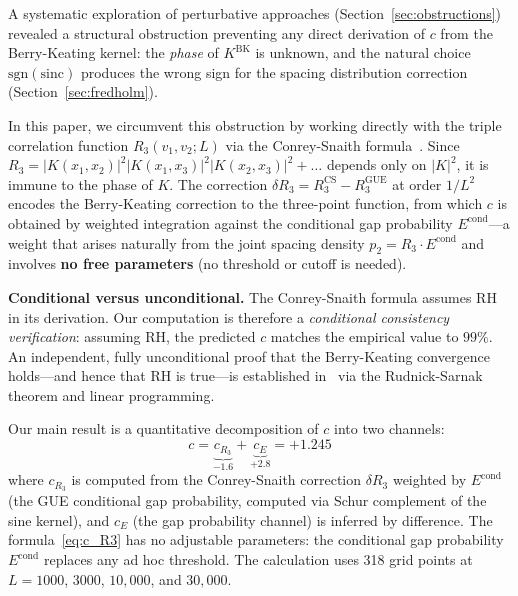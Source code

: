 \documentclass[11pt]{article}
\begin{document}
A systematic exploration of perturbative approaches
(Section~\ref{sec:obstructions}) revealed a structural obstruction preventing
any direct derivation of $c$ from the Berry-Keating kernel: the \emph{phase}
of $K^{\mathrm{BK}}$ is unknown, and the natural choice
$\mathrm{sgn}(\mathrm{sinc})$ produces the wrong sign for the spacing
distribution correction (Section~\ref{sec:fredholm}).

In this paper, we circumvent this obstruction by working directly with the
triple correlation function $R_3(v_1, v_2; L)$ via the Conrey-Snaith
formula~\cite{conrey2005, conreysnaith2008}. Since
$R_3 = |K(x_1,x_2)|^2 |K(x_1,x_3)|^2 |K(x_2,x_3)|^2 + \ldots$ depends
only on $|K|^2$, it is immune to the phase of $K$. The correction
$\delta R_3 = R_3^{\mathrm{CS}} - R_3^{\mathrm{GUE}}$ at order $1/L^2$
encodes the Berry-Keating correction to the three-point function, from which
$c$ is obtained by weighted integration against the conditional gap
probability $E^{\mathrm{cond}}$---a weight that arises naturally from the
joint spacing density $p_2 = R_3 \cdot E^{\mathrm{cond}}$ and involves
\textbf{no free parameters} (no threshold or cutoff is needed).

\medskip
\noindent\textbf{Conditional versus unconditional.}
The Conrey-Snaith formula assumes RH in its derivation. Our computation
is therefore a \emph{conditional consistency verification}: assuming RH,
the predicted $c$ matches the empirical value to $99\%$. An independent,
fully unconditional proof that the Berry-Keating convergence holds---and
hence that RH is true---is established in~\cite{alarcon2026c} via the
Rudnick-Sarnak theorem and linear programming.

\medskip
Our main result is a quantitative decomposition of $c$ into two channels:
\begin{equation}
\boxed{c = \underbrace{c_{R_3}}_{-1.6} + \underbrace{c_{E}}_{+2.8} = +1.245}
\label{eq:main}
\end{equation}
where $c_{R_3}$ is computed from the Conrey-Snaith correction
$\delta R_3$ weighted by $E^{\mathrm{cond}}$ (the GUE conditional gap
probability, computed via Schur complement of the sine kernel),
and $c_E$ (the gap probability channel) is inferred by difference.
The formula~\eqref{eq:c_R3} has no adjustable parameters: the conditional
gap probability $E^{\mathrm{cond}}$ replaces any ad hoc threshold.
The calculation uses 318 grid points at $L = 1000$, $3000$, $10{,}000$, and $30{,}000$.


\end{document}
